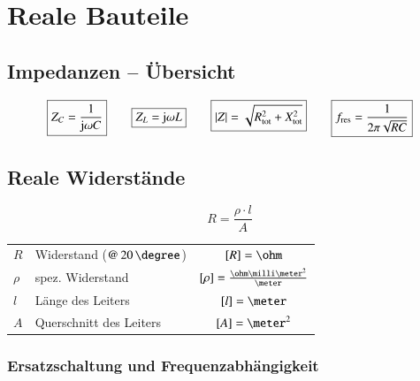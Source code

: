 \section{Reale Bauteile}

\subsection{Impedanzen -- Übersicht}

$$ \boxed{ Z_C = \frac{1}{\mathrm{j} \omega C} } 
    \qquad \boxed{ Z_L = \mathrm{j} \omega L } 
    \qquad \boxed{ |Z| = \sqrt{R_{\rm tot}^2 + X_{\rm tot}^2 } }
    \qquad \boxed{ f_{\rm res} = \frac{1}{2 \pi \sqrt{ R C} } } $$


\subsection{Reale Widerstände}

\begin{minipage}[c]{0.20\columnwidth}
    $$ \boxed{R = \frac{\rho \cdot l}{A}} $$
\end{minipage}
\hfill
\begin{minipage}[c]{0.78\columnwidth}
    \begin{tabular}{llc}
        $R$     & Widerstand ($@ \, 20 \, \degree$)         & $[R] = \ohm$ \\
        $\rho$  & spez. Widerstand                          & $[\rho] = \frac{\ohm \milli \meter^2}{\meter}$ \\
        $l$     & Länge des Leiters                         & $[l] = \meter$ \\
        $A$     & Querschnitt des Leiters                   & $[A] = \meter^2$
    \end{tabular}
\end{minipage}


\subsubsection{Ersatzschaltung und Frequenzabhängigkeit}

